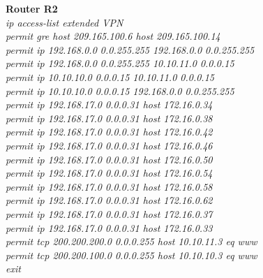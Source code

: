 \documentclass[a4paper, 12pt]{article}
\begin{document}
\hspace*{1cm}\textbf{Router R2}	\\
\hspace*{2cm}\textit{ip access-list extended VPN\\
\hspace*{2cm}permit gre host 209.165.100.6 host 209.165.100.14\\
\hspace*{2cm}permit ip 192.168.0.0 0.0.255.255 192.168.0.0 0.0.255.255\\
\hspace*{2cm}permit ip 192.168.0.0 0.0.255.255 10.10.11.0 0.0.0.15\\
\hspace*{2cm}permit ip 10.10.10.0 0.0.0.15 10.10.11.0 0.0.0.15\\
\hspace*{2cm}permit ip 10.10.10.0 0.0.0.15 192.168.0.0 0.0.255.255\\
\hspace*{2cm}permit ip 192.168.17.0 0.0.0.31 host 172.16.0.34\\
\hspace*{2cm}permit ip 192.168.17.0 0.0.0.31 host 172.16.0.38\\
\hspace*{2cm}permit ip 192.168.17.0 0.0.0.31 host 172.16.0.42\\
\hspace*{2cm}permit ip 192.168.17.0 0.0.0.31 host 172.16.0.46\\
\hspace*{2cm}permit ip 192.168.17.0 0.0.0.31 host 172.16.0.50\\
\hspace*{2cm}permit ip 192.168.17.0 0.0.0.31 host 172.16.0.54\\
\hspace*{2cm}permit ip 192.168.17.0 0.0.0.31 host 172.16.0.58\\
\hspace*{2cm}permit ip 192.168.17.0 0.0.0.31 host 172.16.0.62\\
\hspace*{2cm}permit ip 192.168.17.0 0.0.0.31 host 172.16.0.37\\
\hspace*{2cm}permit ip 192.168.17.0 0.0.0.31 host 172.16.0.33\\
\hspace*{2cm}permit tcp 200.200.200.0 0.0.0.255 host 10.10.11.3 eq www\\
\hspace*{2cm}permit tcp 200.200.100.0 0.0.0.255 host 10.10.10.3 eq www\\
\hspace*{2cm}exit\\}
\end{document}
